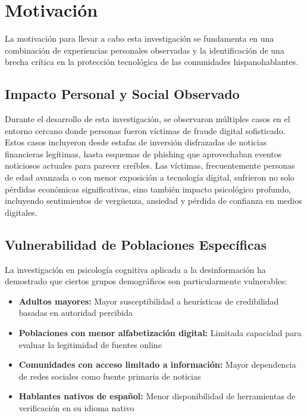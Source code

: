 \section{Motivación}

La motivación para llevar a cabo esta investigación se fundamenta en una combinación de experiencias personales observadas y la identificación de una brecha crítica en la protección tecnológica de las comunidades hispanohablantes.

\subsection{Impacto Personal y Social Observado}

Durante el desarrollo de esta investigación, se observaron múltiples casos en el entorno cercano donde personas fueron víctimas de fraude digital sofisticado. Estos casos incluyeron desde estafas de inversión disfrazadas de noticias financieras legítimas, hasta esquemas de phishing que aprovechaban eventos noticiosos actuales para parecer creíbles. Las víctimas, frecuentemente personas de edad avanzada o con menor exposición a tecnología digital, sufrieron no solo pérdidas económicas significativas, sino también impacto psicológico profundo, incluyendo sentimientos de vergüenza, ansiedad y pérdida de confianza en medios digitales.

\subsection{Vulnerabilidad de Poblaciones Específicas}

La investigación en psicología cognitiva aplicada a la desinformación \cite{ali2021fake} ha demostrado que ciertos grupos demográficos son particularmente vulnerables:

\begin{itemize}
    \item \textbf{Adultos mayores:} Mayor susceptibilidad a heurísticas de credibilidad basadas en autoridad percibida
    \item \textbf{Poblaciones con menor alfabetización digital:} Limitada capacidad para evaluar la legitimidad de fuentes online
    \item \textbf{Comunidades con acceso limitado a información:} Mayor dependencia de redes sociales como fuente primaria de noticias
    \item \textbf{Hablantes nativos de español:} Menor disponibilidad de herramientas de verificación en su idioma nativo
\end{itemize}

